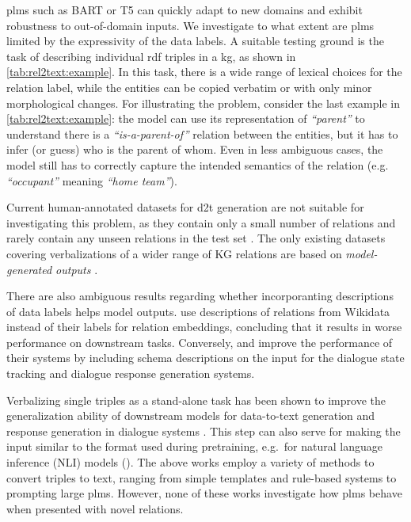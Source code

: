 \acp{plm} such as BART \cite{lewisBARTDenoisingSequencetoSequence2019} or T5 \cite{raffelExploringLimitsTransfer2019} can quickly adapt to new domains and exhibit robustness to out-of-domain inputs. We investigate to what extent are \acp{plm} limited by the expressivity of the data labels. A suitable testing ground is the task of describing individual \acs{rdf} triples in a \ac{kg}, as shown in \autoref{tab:rel2text:example}. In this task, there is a wide range of lexical choices for the relation label, while the entities can be copied verbatim or with only minor morphological changes. For illustrating the problem, consider the last example in \autoref{tab:rel2text:example}: the model can use its representation of \emph{``parent''} to understand there is a \emph{``is-a-parent-of''} relation between the entities, but it has to infer (or guess) who is the parent of whom. Even in less ambiguous cases, the model still has to correctly capture the intended semantics of the relation (e.g. \emph{``occupant''} meaning \emph{``home team''}).


Current human-annotated datasets for \ac{d2t} generation are not suitable for investigating this problem, as they contain only a small number of relations and rarely contain any unseen relations in the test set \cite{mille2021automatic}. The only existing datasets covering verbalizations of a wider range of KG relations are based on \emph{model-generated outputs} \cite{agarwalKnowledgeGraphBased2021,amaral2022wdv}.

There are also ambiguous results regarding whether incorporanting descriptions of data labels helps model outputs. \citet{wang2021kepler} use descriptions of relations from Wikidata instead of their labels for relation embeddings, concluding that it results in worse performance on downstream tasks. Conversely, \citet{kale-rastogi-2020-template} and \citet{lee2021dialogue} improve the performance of their systems by including schema descriptions on the input for the dialogue state tracking and dialogue response generation systems.

Verbalizing single triples as a stand-alone task has been shown to improve the generalization ability of downstream models for data-to-text generation \cite{laha2020scalable,kasnerkasnerDatatoTextGenerationIterative2020,kasner2022neural,xiangASDOTAnyShotDatatoText2022} and response generation in dialogue systems \cite{kale-rastogi-2020-template}. This step can also serve for making the input similar to the format used during pretraining, e.g.\ for  natural language inference (NLI) models (\citealp{gupta2020infotabs,neeraja2021incorporating,duvsek2020evaluating}). The above works employ a variety of methods to convert triples to text, ranging from simple templates and rule-based systems to prompting large \acp{plm}. However, none of these works investigate how \acp{plm} behave when presented with novel relations.



